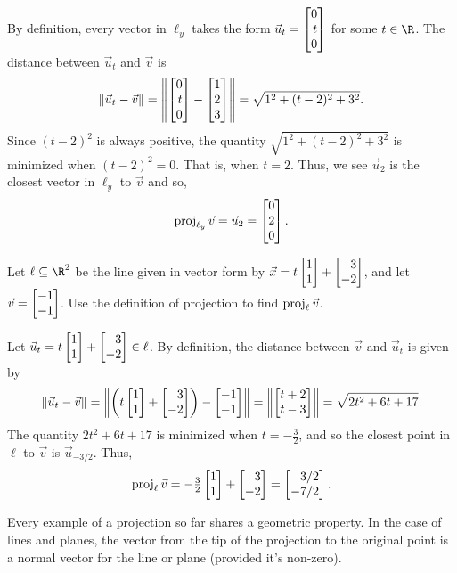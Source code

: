 By definition, every vector in $\ell_y$ takes the form $\vec u_t=\mat{0\\t\\0}$ for some $t\in \R$. The distance
between $\vec u_t$ and $\vec v$ is
\[
	\Norm{\vec u_t-\vec v}=\norm*{\mat{0\\t\\0}-\mat{1\\2\\3}} = \sqrt{1^2+(t-2)^2+3^2}.
\]
Since $(t-2)^2$ is always positive, the quantity $\sqrt{1^2+(t-2)^2+3^2}$ is minimized when $(t-2)^2=0$. That is,
when $t=2$. Thus, we see $\vec u_2$ is the closest vector in $\ell_y$ to $\vec v$ and so,
\[
	\Proj_{\ell_y}\vec v=\vec u_2=\mat{0\\2\\0}.
\]


\begin{example}
	Let $\ell\subseteq \R^2$ be the line given in vector form by $\vec x=t\mat{1\\1}+\mat{3\\-2}$,
	and let $\vec v=\mat{-1\\-1}$. Use the definition of projection to find $\operatorname{proj}_\ell \vec v$.

	Let $\vec u_t=t\mat{1\\1}+\mat{3\\-2}\in\ell$.
	By definition, the distance between $\vec v$ and $\vec u_t$ is given by
	\[
		\Norm{\vec u_t-\vec v}=\norm*{\left(t\mat{1\\1}+\mat{3\\-2}\right)-\mat{-1\\-1}} = \norm*{\mat{t+2\\t-3}}
	    =\sqrt{2t^2+6t+17}.
	\]
	The quantity $2t^2+6t+17$ is minimized when $t=-\frac{3}{2}$, and so the closest point
	in $\ell$ to $\vec v$ is $\vec u_{-3/2}$. Thus,
	\[
	    \Proj_\ell \vec v=-\tfrac{3}{2}\mat{1\\1}+\mat{3\\-2}=\mat{3/2\\-7/2}.
	\]
\end{example}

Every example of a projection so far shares a geometric property. In the case of lines and planes,
the vector from the tip of the projection to the original point is a normal vector for the line or plane (provided it's non-zero).

